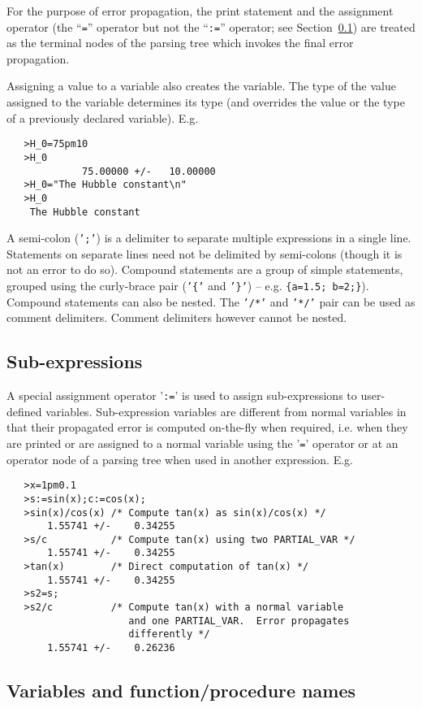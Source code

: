 \documentclass[11pt]{article}
\begin{document}
For the purpose of error propagation, the print statement and the
assignment operator (the ``{\tt =}'' operator but not the ``{\tt :=}''
operator; see Section~\ref{APPEN:SUBEXPRESSIONS}) are treated as the
terminal nodes of the parsing tree which invokes the final error
propagation.

Assigning a value to a variable also creates the variable.  The type
of the value assigned to the variable determines its type (and overrides
the value or the type of a previously declared variable).  E.g.
\begin{verbatim}
   >H_0=75pm10
   >H_0
             75.00000 +/-   10.00000
   >H_0="The Hubble constant\n"
   >H_0
    The Hubble constant
\end{verbatim}
A semi-colon ({\tt ';'}) is a delimiter to separate multiple expressions in a single
line.  Statements on separate lines need not be delimited by semi-colons (though it is
not an error to do so).  Compound statements are a group of simple statements, grouped
using the curly-brace pair ({\tt '\{'} and {\tt '\}'}) -- e.g. {\tt \{a=1.5;
  b=2;\}}). Compound statements can also be nested.  The {\tt '/\/*'} and {\tt '*/'} pair
can be used as comment delimiters.  Comment delimiters however cannot be nested.

\subsection{Sub-expressions}
\label{APPEN:SUBEXPRESSIONS}

A special assignment operator '{\tt :=}' is used to assign
sub-expressions to user-defined variables.  Sub-expression variables
are different from normal variables in that their propagated error is
computed on-the-fly when required, i.e.  when they are printed or are
assigned to a normal variable using the '{\tt =}' operator or at an
operator node of a parsing tree when used in another expression.  E.g.
\begin{verbatim}
   >x=1pm0.1
   >s:=sin(x);c:=cos(x);
   >sin(x)/cos(x) /* Compute tan(x) as sin(x)/cos(x) */
       1.55741 +/-    0.34255
   >s/c           /* Compute tan(x) using two PARTIAL_VAR */
       1.55741 +/-    0.34255
   >tan(x)        /* Direct computation of tan(x) */
       1.55741 +/-    0.34255
   >s2=s;
   >s2/c          /* Compute tan(x) with a normal variable
                     and one PARTIAL_VAR.  Error propagates 
                     differently */
       1.55741 +/-    0.26236
\end{verbatim}
\subsection{Variables and function/procedure names}
\end{document}
